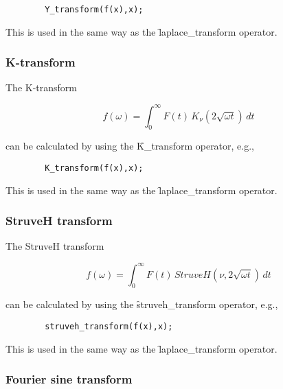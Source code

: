 \begin{verbatim}
        Y_transform(f(x),x);
\end{verbatim}

This is used in the same way as the \f{laplace\_transform} operator.

\subsubsection{K-transform}
\hypertarget{operator:K_TRANSFORM}{}

The K-transform

\[
f(\omega) = \int_{0}^{\infty} F(t) \,K_{\nu}(2\sqrt{\omega t}) \,dt
\]

can be calculated by using the \f{K\_transform} operator, e.g.,

\begin{verbatim}
        K_transform(f(x),x);
\end{verbatim}

This is used in the same way as the \f{laplace\_transform} operator.

\subsubsection{StruveH transform}
\hypertarget{operator:STRUVEH_TRANSFORM}{}

The StruveH transform

\[
f(\omega) = \int_{0}^{\infty} F(t) \,StruveH(\nu,2\sqrt{\omega t}) \,dt
\]

can be calculated by using the \f{struveh\_transform} operator, e.g.,

\begin{verbatim}
        struveh_transform(f(x),x);
\end{verbatim}

This is used in the same way as the \f{laplace\_transform} operator.

\subsubsection{Fourier sine transform}
\hypertarget{operator:FOURIER_SIN}{}

